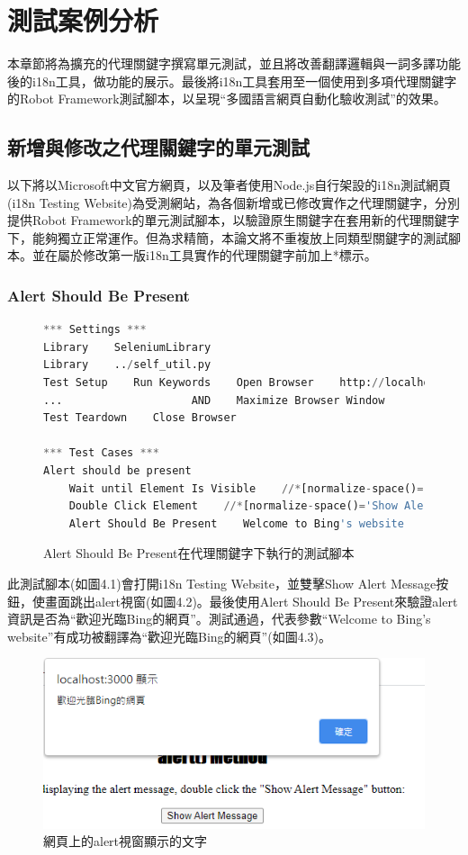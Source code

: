 \chapter{測試案例分析}
本章節將為擴充的代理關鍵字撰寫單元測試\cite{ut}，並且將改善翻譯邏輯與一詞多譯功能後的i18n工具，做功能的展示。最後將i18n工具套用至一個使用到多項代理關鍵字的Robot Framework測試腳本，以呈現“多國語言網頁自動化驗收測試”的效果。

\section{新增與修改之代理關鍵字的單元測試}
以下將以Microsoft中文官方網頁\cite{microsoft}，以及筆者使用Node.js\cite{nodejs}自行架設的i18n測試網頁(i18n Testing Website)為受測網站，為各個新增或已修改實作之代理關鍵字，分別提供Robot Framework的單元測試腳本，以驗證原生關鍵字在套用新的代理關鍵字下，能夠獨立正常運作。但為求精簡，本論文將不重複放上同類型關鍵字的測試腳本。並在屬於修改第一版i18n工具實作的代理關鍵字前加上*標示。

\subsection{Alert Should Be Present}
\begin{figure}[H]
\begin{lstlisting}[language={python}]
*** Settings ***
Library    SeleniumLibrary
Library    ../self_util.py
Test Setup    Run Keywords    Open Browser    http://localhost:3000    Chrome
...                    AND    Maximize Browser Window
Test Teardown    Close Browser

*** Test Cases ***
Alert should be present
    Wait until Element Is Visible    //*[normalize-space()='Show Alert Message']    timeout=${shortPeriodOfTime}
    Double Click Element    //*[normalize-space()='Show Alert Message']
    Alert Should Be Present    Welcome to Bing's website
\end{lstlisting}
\caption{Alert Should Be Present在代理關鍵字下執行的測試腳本}
\end{figure}
此測試腳本(如圖4.1)會打開i18n Testing Website，並雙擊Show Alert Message按鈕，使畫面跳出alert視窗(如圖4.2)。最後使用Alert Should Be Present來驗證alert資訊是否為“歡迎光臨Bing的網頁”。測試通過，代表參數“Welcome to Bing’s website”有成功被翻譯為“歡迎光臨Bing的網頁”(如圖4.3)。

\begin{figure}[H]
\includegraphics[width= \textwidth]{../論文截圖/4-1-2 alert視窗的文字.png}
\caption{網頁上的alert視窗顯示的文字}
\end{figure}

